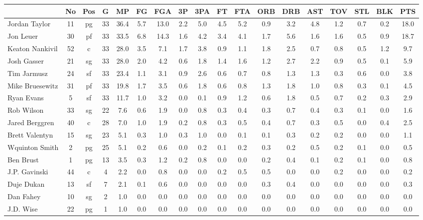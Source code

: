 \documentclass[10pt,letterpaper]{article}
\begin{document}
\begin{table}[ht]
\begin{center}
\begin{tabular}{lccccccccccccccccc}
  \hline
 & No & Pos & G & MP & FG & FGA & 3P & 3PA & FT & FTA & ORB & DRB & AST & TOV & STL & BLK & PTS \\ 
  \hline
Jordan Taylor & 11 & pg & 33 & 36.4 & 5.7 & 13.0 & 2.2 & 5.0 & 4.5 & 5.2 & 0.9 & 3.2 & 4.8 & 1.2 & 0.7 & 0.2 & 18.0 \\ 
  Jon Leuer & 30 & pf & 33 & 33.5 & 6.8 & 14.3 & 1.6 & 4.2 & 3.4 & 4.1 & 1.7 & 5.6 & 1.6 & 1.6 & 0.5 & 0.9 & 18.7 \\ 
  Keaton Nankivil & 52 & c & 33 & 28.0 & 3.5 & 7.1 & 1.7 & 3.8 & 0.9 & 1.1 & 1.8 & 2.5 & 0.7 & 0.8 & 0.5 & 1.2 & 9.7 \\ 
  Josh Gasser & 21 & sg & 33 & 28.0 & 2.0 & 4.2 & 0.6 & 1.8 & 1.4 & 1.6 & 1.2 & 2.7 & 2.2 & 0.9 & 0.5 & 0.1 & 5.9 \\ 
  Tim Jarmusz & 24 & sf & 33 & 23.4 & 1.1 & 3.1 & 0.9 & 2.6 & 0.6 & 0.7 & 0.8 & 1.3 & 1.3 & 0.3 & 0.6 & 0.0 & 3.8 \\ 
  Mike Bruesewitz & 31 & pf & 33 & 19.8 & 1.7 & 3.5 & 0.6 & 1.8 & 0.6 & 0.8 & 1.3 & 1.8 & 1.0 & 0.8 & 0.3 & 0.1 & 4.5 \\ 
  Ryan Evans & 5 & sf & 33 & 11.7 & 1.0 & 3.2 & 0.0 & 0.1 & 0.9 & 1.2 & 0.6 & 1.8 & 0.5 & 0.7 & 0.2 & 0.3 & 2.9 \\ 
  Rob Wilson & 33 & sg & 22 & 7.6 & 0.6 & 1.9 & 0.0 & 0.8 & 0.3 & 0.4 & 0.3 & 0.7 & 0.4 & 0.3 & 0.1 & 0.0 & 1.6 \\ 
  Jared Berggren & 40 & c & 28 & 7.0 & 1.0 & 1.9 & 0.2 & 0.8 & 0.3 & 0.5 & 0.4 & 0.7 & 0.3 & 0.5 & 0.0 & 0.4 & 2.5 \\ 
  Brett Valentyn & 15 & sg & 23 & 5.1 & 0.3 & 1.0 & 0.3 & 1.0 & 0.0 & 0.1 & 0.1 & 0.3 & 0.2 & 0.2 & 0.0 & 0.0 & 1.1 \\ 
  Wquinton Smith & 2 & pg & 25 & 5.1 & 0.2 & 0.6 & 0.0 & 0.2 & 0.1 & 0.2 & 0.3 & 0.2 & 0.5 & 0.2 & 0.1 & 0.0 & 0.5 \\ 
  Ben Brust & 1 & pg & 13 & 3.5 & 0.3 & 1.2 & 0.2 & 0.8 & 0.0 & 0.0 & 0.2 & 0.4 & 0.1 & 0.2 & 0.1 & 0.0 & 0.8 \\ 
  J.P. Gavinski & 44 & c & 4 & 2.2 & 0.0 & 0.8 & 0.0 & 0.0 & 0.2 & 0.5 & 0.5 & 0.0 & 0.0 & 0.2 & 0.0 & 0.0 & 0.2 \\ 
  Duje Dukan & 13 & sf & 7 & 2.1 & 0.1 & 0.6 & 0.0 & 0.0 & 0.0 & 0.0 & 0.3 & 0.4 & 0.0 & 0.0 & 0.0 & 0.0 & 0.3 \\ 
  Dan Fahey & 10 & sg & 2 & 1.0 & 0.0 & 0.0 & 0.0 & 0.0 & 0.0 & 0.0 & 0.0 & 0.0 & 0.0 & 0.0 & 0.0 & 0.0 & 0.0 \\ 
  J.D. Wise & 22 & pg & 1 & 1.0 & 0.0 & 0.0 & 0.0 & 0.0 & 0.0 & 0.0 & 0.0 & 0.0 & 0.0 & 0.0 & 0.0 & 0.0 & 0.0 \\ 
   \hline
\end{tabular}
\end{center}
\end{table}
\end{document}
